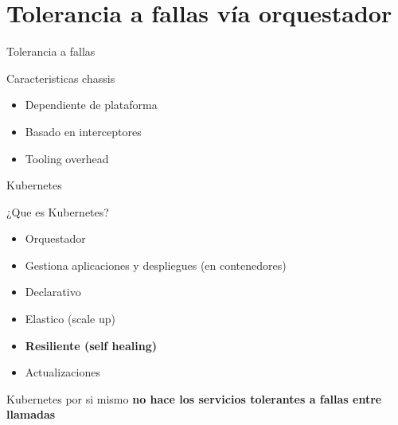 \documentclass[aspectratio=169]{beamer}
\begin{document}
{
    \section{Tolerancia a fallas vía orquestador}
}

\begin{frame}{Tolerancia a fallas}

    \begin{block}{Caracteristicas chassis}
        \begin{itemize}
            \item Dependiente de plataforma
            \item Basado en interceptores
            \item Tooling overhead
        \end{itemize}
    \end{block}

\end{frame}

\begin{frame}{Kubernetes}

    \begin{exampleblock}{¿Que es Kubernetes?}
        \begin{itemize}
            \item Orquestador
            \item Gestiona aplicaciones y despliegues (en contenedores)
            \item Declarativo
            \item Elastico (scale up)
            \item \textbf{Resiliente (self healing)}
            \item Actualizaciones
        \end{itemize}
    \end{exampleblock}
Kubernetes por si mismo \textbf{no hace los servicios tolerantes a fallas entre llamadas}
\end{frame}
\end{document}
